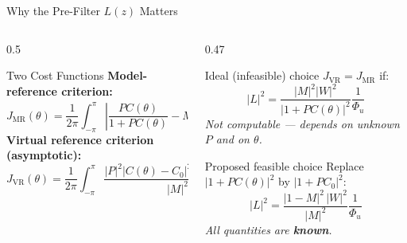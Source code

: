 \documentclass[aspectratio=169]{beamer}
\begin{document}
\begin{frame}{Why the Pre-Filter $L(z)$ Matters}
  \begin{columns}[T]
    \begin{column}{0.5\textwidth}
      \begin{block}{Two Cost Functions}
        \textbf{Model-reference criterion:}
        \[
          J_{\mathrm{MR}}(\theta)=\frac{1}{2\pi}\!\int_{-\pi}^{\pi}
          \!\!\left|\frac{PC(\theta)}{1+PC(\theta)}-M\right|^2\!|W|^2 d\omega
        \]
        \vspace{0.2em}
        \textbf{Virtual reference criterion (asymptotic):}
        \[
          J_{\mathrm{VR}}(\theta)=\frac{1}{2\pi}\!\int_{-\pi}^{\pi}
          \!\!\frac{|P|^2|C(\theta)-C_0|^2|1-M|^2|L|^2}{|M|^2}\Phi_u\; d\omega
        \]
      \end{block}
    \end{column}
    \begin{column}{0.47\textwidth}
      \begin{exampleblock}{Ideal (infeasible) choice}
        $J_{\mathrm{VR}} = J_{\mathrm{MR}}$ if:
        \[ |L|^2 = \frac{|M|^2|W|^2}{|1+PC(\theta)|^2}\frac{1}{\Phi_u} \]
        \textit{Not computable — depends on unknown $P$ and on $\theta$.}
      \end{exampleblock}
      \vspace{0.4em}
      \begin{alertblock}{Proposed feasible choice}
        Replace $|1+PC(\theta)|^2$ by $|1+PC_0|^2$:
        \[
          \boxed{|L|^2 = \frac{|1-M|^2\,|W|^2}{|M|^2}\frac{1}{\Phi_u}}
        \]
        \textit{All quantities are \textbf{known}.}
      \end{alertblock}
    \end{column}
  \end{columns}
\end{frame}
\end{document}
